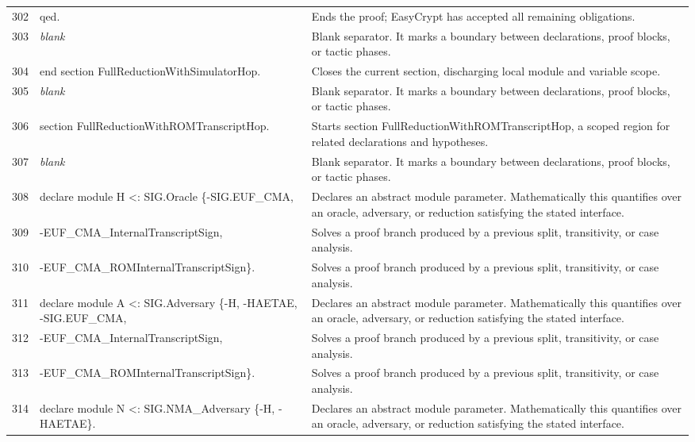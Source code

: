 \documentclass[10pt]{article}
\begin{document}
\begin{longtable}{r L{0.53\textwidth} L{0.37\textwidth}}
302 & {\ttfamily\scriptsize qed.} & Ends the proof; EasyCrypt has accepted all remaining obligations. \\
303 & {\ttfamily\scriptsize \emph{blank}} & Blank separator.  It marks a boundary between declarations, proof blocks, or tactic phases. \\
304 & {\ttfamily\scriptsize end section FullReductionWithSimulatorHop.} & Closes the current section, discharging local module and variable scope. \\
305 & {\ttfamily\scriptsize \emph{blank}} & Blank separator.  It marks a boundary between declarations, proof blocks, or tactic phases. \\
306 & {\ttfamily\scriptsize section FullReductionWithROMTranscriptHop.} & Starts section FullReductionWithROMTranscriptHop, a scoped region for related declarations and hypotheses. \\
307 & {\ttfamily\scriptsize \emph{blank}} & Blank separator.  It marks a boundary between declarations, proof blocks, or tactic phases. \\
308 & {\ttfamily\scriptsize declare module H <: SIG.Oracle \{-SIG.EUF\_CMA,} & Declares an abstract module parameter.  Mathematically this quantifies over an oracle, adversary, or reduction satisfying the stated interface. \\
309 & {\ttfamily\scriptsize                                  -EUF\_CMA\_InternalTranscriptSign,} & Solves a proof branch produced by a previous split, transitivity, or case analysis. \\
310 & {\ttfamily\scriptsize                                  -EUF\_CMA\_ROMInternalTranscriptSign\}.} & Solves a proof branch produced by a previous split, transitivity, or case analysis. \\
311 & {\ttfamily\scriptsize declare module A <: SIG.Adversary \{-H, -HAETAE, -SIG.EUF\_CMA,} & Declares an abstract module parameter.  Mathematically this quantifies over an oracle, adversary, or reduction satisfying the stated interface. \\
312 & {\ttfamily\scriptsize                                     -EUF\_CMA\_InternalTranscriptSign,} & Solves a proof branch produced by a previous split, transitivity, or case analysis. \\
313 & {\ttfamily\scriptsize                                     -EUF\_CMA\_ROMInternalTranscriptSign\}.} & Solves a proof branch produced by a previous split, transitivity, or case analysis. \\
314 & {\ttfamily\scriptsize declare module N <: SIG.NMA\_Adversary \{-H, -HAETAE\}.} & Declares an abstract module parameter.  Mathematically this quantifies over an oracle, adversary, or reduction satisfying the stated interface. \\

\end{longtable}
\end{document}
